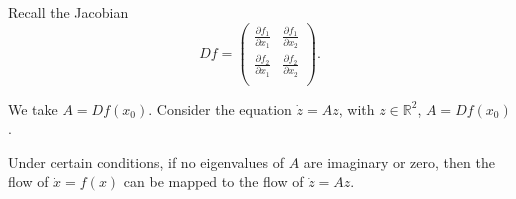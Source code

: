 \documentclass[11pt]{scrartcl}
\newcommand{\R}{\mathbb{R}}
\let \p \partial
\newcommand{\1}{\textbf{1}} %
\begin{document}
Recall the Jacobian
$$Df = \begin{pmatrix}
\frac{\p f_1}{\p x_1} & \frac{\p f_1}{\p x_2} \\
\frac{\p f_2}{\p x_1} & \frac{\p f_2}{\p x_2} \\
\end{pmatrix}.$$

We take $A = Df(x_0)$.  Consider the equation $\dot{z} = Az$, with $z \in \R^2$, $A = Df(x_0)$.  
\begin{theorem} Under certain conditions, if no eigenvalues of $A$ are imaginary or zero, then the flow of $\dot{x} = f(x)$ can be mapped to the flow of $\dot{z} = Az$.
\end{theorem}
\end{document}
